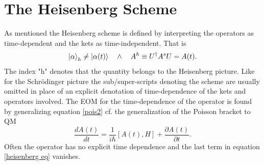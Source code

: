 \section{The Heisenberg Scheme}
As mentioned the Heisenberg scheme is defined by interpreting the operators as time-dependent and the kets as time-independent. That is
\begin{equation}
	\ket{\alpha}_h\neq \ket{\alpha(t)} \quad \wedge \quad A^{h}\equiv U^\dagger A^sU=A(t).
\end{equation}   
The index "h" denotes that the quantity belongs to the Heisenberg picture. Like for the Schrödinger picture the sub/super-scripts denoting the scheme are usually omitted in place of an explicit denotation of time-dependence of the kets and operators involved.
The EOM for the time-dependence of the operator is found by generalizing equation \eqref{pois2} cf. the generalization of the Poisson bracket to QM
\begin{equation}
	\frac{dA(t)}{dt}=\frac{1}{i\hbar}[A(t),H]+\frac{\partial A(t)}{\partial t}.
	\label{heisenberg eq}
\end{equation}   
Often the operator has no explicit time dependence and the last term in equation \eqref{heisenberg eq} vanishes.
